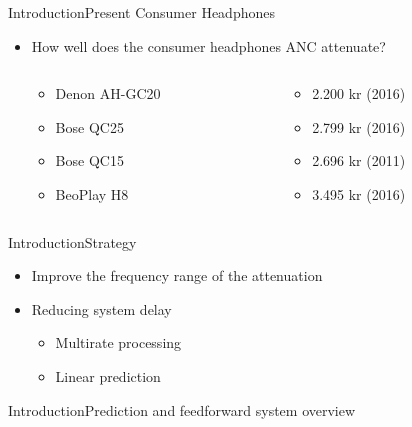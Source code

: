\begin{frame}{Introduction}{Present Consumer Headphones}
	\begin{itemize}	
	\item How well does the consumer headphones ANC attenuate?
	\begin{columns}
		\begin{column}{0.27\textwidth}
		\begin{itemize}
			\item Denon AH-GC20
			\item Bose QC25 
			\item Bose QC15 	
			\item BeoPlay H8 	
		\end{itemize}
		\end{column}
		\begin{column}{0.6\textwidth} 
		\begin{itemize}
			\item[] 2.200 kr (2016)
			\item[] 2.799 kr (2016)
			\item[] 2.696 kr (2011)
			\item[] 3.495 kr (2016)
		\end{itemize}
		\end{column}
	\end{columns}
	\end{itemize}			
	\begin{center}
		
	\end{center}	
\end{frame}


\begin{frame}{Introduction}{Strategy}
	\begin{center}
	\begin{itemize}
		\item Improve the frequency range of the attenuation
		\item Reducing system delay
		\begin{itemize}	
		\item Multirate processing
		\item Linear prediction
		\end{itemize}				
	\end{itemize}
	\end{center}
\end{frame}

\begin{frame}{Introduction}{Prediction and feedforward system overview}
	\begin{center}
		\resizebox{0.85\columnwidth}{!}{	
		
		}	
	\end{center}
\end{frame}
